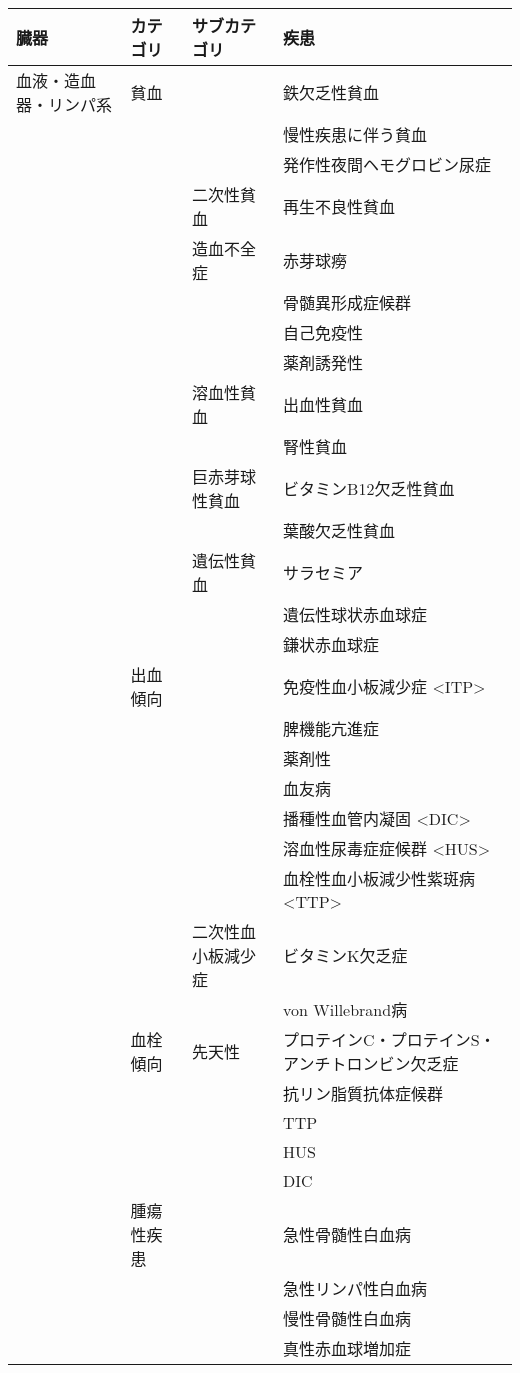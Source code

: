 \begin{xltabular}{\linewidth}{XXXX}
\caption{\label{tbl:diseases}} \\
\toprule
臓器 & カテゴリ & サブカテゴリ & 疾患 \\
\midrule
\endhead
血液・造血器・リンパ系 & 貧血 &  & 鉄欠乏性貧血 \\
 &  &  & 慢性疾患に伴う貧血 \\
 &  &  & 発作性夜間ヘモグロビン尿症 \\
 &  & 二次性貧血 & 再生不良性貧血 \\
 &  & 造血不全症 & 赤芽球癆 \\
 &  &  & 骨髄異形成症候群 \\
 &  &  & 自己免疫性 \\
 &  &  & 薬剤誘発性 \\
 &  & 溶血性貧血 & 出血性貧血 \\
 &  &  & 腎性貧血 \\
 &  & 巨赤芽球性貧血 & ビタミンB12欠乏性貧血 \\
 &  &  & 葉酸欠乏性貧血 \\
 &  & 遺伝性貧血 & サラセミア \\
 &  &  & 遺伝性球状赤血球症 \\
 &  &  & 鎌状赤血球症 \\
 & 出血傾向 &  & 免疫性血小板減少症 <ITP> \\
 &  &  & 脾機能亢進症 \\
 &  &  & 薬剤性 \\
 &  &  & 血友病 \\
 &  &  & 播種性血管内凝固 <DIC> \\
 &  &  & 溶血性尿毒症症候群 <HUS> \\
 &  &  & 血栓性血小板減少性紫斑病 <TTP> \\
 &  & 二次性血小板減少症 & ビタミンK欠乏症 \\
 &  &  & von Willebrand病 \\
 & 血栓傾向 & 先天性 & プロテインC・プロテインS・アンチトロンビン欠乏症 \\
 &  &  & 抗リン脂質抗体症候群 \\
 &  &  & TTP \\
 &  &  & HUS \\
 &  &  & DIC \\
 & 腫瘍性疾患 &  & 急性骨髄性白血病 \\
 &  &  & 急性リンパ性白血病 \\
 &  &  & 慢性骨髄性白血病 \\
 &  &  & 真性赤血球増加症 \\

\end{xltabular}
